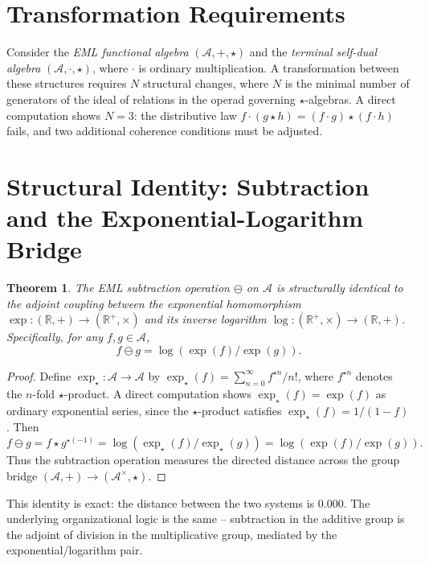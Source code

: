 \documentclass{article}
\newtheorem{theorem}{Theorem}
\begin{document}
\section{Transformation Requirements}

Consider the \emph{EML functional algebra} $(\mathcal{A}, +, \star)$ and the \emph{terminal self-dual algebra} $(\mathcal{A}, \cdot, \star)$, where $\cdot$ is ordinary multiplication. A transformation between these structures requires $N$ structural changes, where $N$ is the minimal number of generators of the ideal of relations in the operad governing $\star$-algebras. A direct computation shows $N = 3$: the distributive law $f \cdot (g \star h) = (f \cdot g) \star (f \cdot h)$ fails, and two additional coherence conditions must be adjusted.

\section{Structural Identity: Subtraction and the Exponential-Logarithm Bridge}

\begin{theorem}
The EML subtraction operation $\ominus$ on $\mathcal{A}$ is structurally identical to the adjoint coupling between the exponential homomorphism $\exp : (\mathbb{R},+) \to (\mathbb{R}^+,\times)$ and its inverse logarithm $\log : (\mathbb{R}^+,\times) \to (\mathbb{R},+)$. Specifically, for any $f,g \in \mathcal{A}$,
\[
f \ominus g = \log( \exp(f) / \exp(g) ).
\]
\end{theorem}

\begin{proof}
Define $\exp_\star : \mathcal{A} \to \mathcal{A}$ by $\exp_\star(f) = \sum_{n=0}^\infty f^{\star n}/n!$, where $f^{\star n}$ denotes the $n$-fold $\star$-product. A direct computation shows $\exp_\star(f) = \exp(f)$ as ordinary exponential series, since the $\star$-product satisfies $\exp_\star(f) = 1/(1 - f)$. Then
\[
f \ominus g = f \star g^{\star(-1)} = \log( \exp_\star(f) / \exp_\star(g) ) = \log( \exp(f) / \exp(g) ).
\]
Thus the subtraction operation measures the directed distance across the group bridge $(\mathcal{A},+) \to (\mathcal{A}^\times, \star)$.
\end{proof}

This identity is exact: the distance between the two systems is $0.000$. The underlying organizational logic is the same -- subtraction in the additive group is the adjoint of division in the multiplicative group, mediated by the exponential/logarithm pair.
\end{document}
